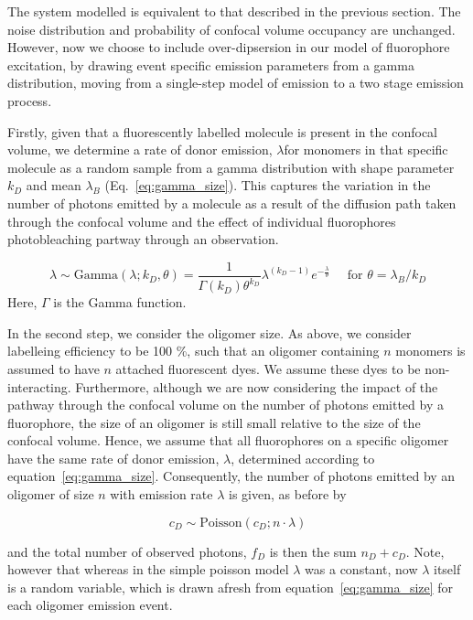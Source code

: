 The system modelled is equivalent to that described in the previous section. The noise distribution and probability of confocal volume occupancy are unchanged. However, now we choose to include over-dipsersion in our model of fluorophore excitation, by drawing event specific emission parameters from a gamma distribution, moving from a single-step model of emission to a two stage emission process. 

Firstly, given that a fluorescently labelled molecule is present in the confocal volume, we determine a rate of donor emission, $\lambda$for monomers in that specific molecule as a random sample from a gamma distribution with shape parameter $k_D$ and mean $\lambda_B$ (Eq.~\ref{eq:gamma_size}). This captures the variation in the number of photons emitted by a molecule as a result of the diffusion path taken through the confocal volume and the effect of individual fluorophores photobleaching partway through an observation.

\begin{equation}
\lambda \sim \text{Gamma}(\lambda; k_D, \theta) =  \frac{1}{\Gamma(k_D) \theta^{k_D}} \lambda^{(k_D - 1)} e^{-\frac{\lambda}{\theta}} \quad\text{ for } \theta = \lambda_B / k_D
\label{eq:gamma_size}
\end{equation} 
Here, $\Gamma$ is the Gamma function. 

In the second step, we consider the oligomer size. As above, we consider labelleing efficiency to be 100 \%, such that an oligomer containing $n$ monomers is assumed to have $n$ attached fluorescent dyes. We assume these dyes to be non-interacting. Furthermore, although we are now considering the impact of the pathway through the confocal volume on the number of photons emitted by a fluorophore, the size of an oligomer is still small relative to the size of the confocal volume. Hence, we assume that all fluorophores on a specific oligomer have the same rate of donor emission, $\lambda$, determined according to equation~\ref{eq:gamma_size}. Consequently, the number of photons emitted by an oligomer of size $n$ with emission rate $\lambda$ is given, as before by

\begin{equation}
c_D \sim \text{Poisson}(c_D; n \cdot \lambda)
\end{equation}  

and the total number of observed photons, $f_D$ is then the sum $n_D + c_D$. Note, however that whereas in the simple poisson model $\lambda$ was a constant, now $\lambda$ itself is a random variable, which is drawn afresh from equation~\ref{eq:gamma_size} for each oligomer emission event.

